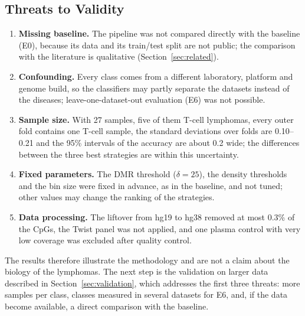 \documentclass[runningheads]{llncs}
\begin{document}
\subsection{Threats to Validity}
\begin{enumerate}
\item \textbf{Missing baseline.} The pipeline was not compared directly with the baseline (E0), because its data and its train/test split are not public; the comparison with the literature is qualitative (Section~\ref{sec:related}).
\item \textbf{Confounding.} Every class comes from a different laboratory, platform and genome build, so the classifiers may partly separate the datasets instead of the diseases; leave-one-dataset-out evaluation (E6) was not possible.
\item \textbf{Sample size.} With 27 samples, five of them T-cell lymphomas, every outer fold contains one T-cell sample, the standard deviations over folds are 0.10--0.21 and the 95\% intervals of the accuracy are about 0.2 wide; the differences between the three best strategies are within this uncertainty.
\item \textbf{Fixed parameters.} The DMR threshold ($\delta=25$), the density thresholds and the bin size were fixed in advance, as in the baseline, and not tuned; other values may change the ranking of the strategies.
\item \textbf{Data processing.} The liftover from hg19 to hg38 removed at most 0.3\% of the CpGs, the Twist panel was not applied, and one plasma control with very low coverage was excluded after quality control.
\end{enumerate}
The results therefore illustrate the methodology and are not a claim about the biology of the lymphomas. The next step is the validation on larger data described in Section~\ref{sec:validation}, which addresses the first three threats: more samples per class, classes measured in several datasets for E6, and, if the data become available, a direct comparison with the baseline.



\end{document}
